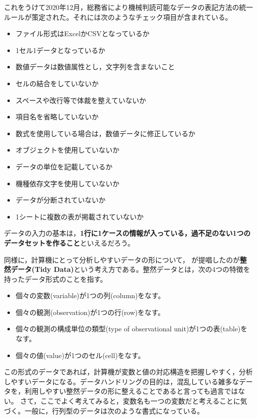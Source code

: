 \documentclass[
  a4paper,
]{ltjsbook}
\providecommand{\tightlist}{%
  \setlength{\itemsep}{0pt}\setlength{\parskip}{0pt}}
\begin{document}
これをうけて2020年12月，総務省により機械判読可能なデータの表記方法の統一ルールが策定された\autocite{soumu}。それには次のようなチェック項目が含まれている。

\begin{itemize}
\tightlist
\item
  ファイル形式はExcelかCSVとなっているか
\item
  1セル1データとなっているか
\item
  数値データは数値属性とし，文字列を含まないこと
\item
  セルの結合をしていないか
\item
  スペースや改行等で体裁を整えていないか
\item
  項目名を省略していないか
\item
  数式を使用している場合は，数値データに修正しているか
\item
  オブジェクトを使用していないか
\item
  データの単位を記載しているか
\item
  機種依存文字を使用していないか
\item
  データが分断されていないか
\item
  1シートに複数の表が掲載されていないか
\end{itemize}

データの入力の基本は，\textbf{1行に1ケースの情報が入っている，過不足のない1つのデータセットを作ること}といえるだろう。

同様に，計算機にとって分析しやすいデータの形について，\textcite{Hadley2014}
が提唱したのが\textbf{整然データ(Tidy
Data)}という考え方である。整然データとは，次の4つの特徴を持ったデータ形式のことを指す。

\begin{itemize}
\tightlist
\item
  個々の変数(variable)が1つの列(column)をなす。
\item
  個々の観測(observation)が1つの行(row)をなす。
\item
  個々の観測の構成単位の類型(type of observational
  unit)が1つの表(table)をなす。
\item
  個々の値(value)が1つのセル(cell)をなす。
\end{itemize}

この形式のデータであれば，計算機が変数と値の対応構造を把握しやすく，分析しやすいデータになる。データハンドリングの目的は，混乱している雑多なデータを，利用しやすい整然データの形に整えることであると言っても過言ではない。
さて，ここでよく考えてみると，変数名も一つの変数だと考えることに気づく。一般に，行列型のデータは次のような書式になっている。
\end{document}
